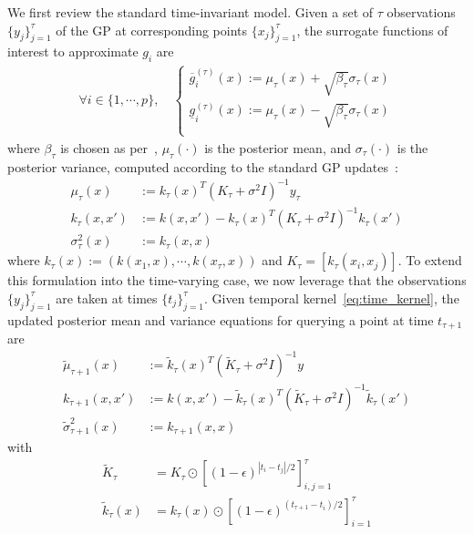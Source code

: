 \documentclass[preprint,12pt]{elsarticle}
\newcommand{\ul}{\underline}
\newcommand{\ol}{\overline}
\begin{document}
We first review the standard time-invariant model. Given a set of $\tau$ observations $\{y_j\}_{j=1}^\tau$ of the \ac{GP} at corresponding points $\{x_j\}_{j=1}^\tau$, the surrogate functions of interest to approximate $g_i$ are 
\begin{align}
    \forall i\in\{1,\cdots,p\}, \quad
    \begin{cases}
    \ol{g}_{i}^{(\tau)}(x) := \mu_\tau(x) + \sqrt{\beta_\tau}\sigma_{\tau}(x)\\
    \ul{g}_i^{(\tau)}(x) := \mu_\tau(x) - \sqrt{\beta_\tau}\sigma_{\tau}(x)\\
    \end{cases}\label{eq:GP-UCB}
\end{align}
where $\beta_\tau$ is chosen as per~\cite[Theorem 7]{caoMMGPOJCSYS},
$\mu_\tau(\cdot)$ is the posterior mean, and $\sigma_\tau(\cdot)$ is the posterior variance, computed according to the standard \ac{GP} updates~\cite{Rasmussen2006}:
\begin{align}
    \mu_\tau(x) &:= k_\tau(x)^T(K_\tau+\sigma^2 I)^{-1}y_\tau\\
    k_\tau(x,x') &:= k(x,x')-k_\tau(x)^T(K_\tau+\sigma^2 I)^{-1}k_\tau(x')\\
    \sigma_\tau^2(x) &:= k_\tau(x,x)
\end{align}
where $k_\tau(x):= (k(x_1,x),\cdots,k(x_\tau,x))$ and $K_\tau=\left[k_\tau(x_i,x_j)\right]$. To extend this formulation into the time-varying case, we now leverage that the observations $\{y_j\}_{j=1}^\tau$ are taken at times $\{t_j\}_{j=1}^\tau$. Given temporal kernel~\eqref{eq:time_kernel}, the updated posterior mean and variance equations for querying a point at time $t_{\tau + 1}$ are
\begin{align}
    \widetilde{\mu}_{\tau+1}(x) &:= \widetilde{k}_\tau(x)^T(\widetilde{K}_\tau+\sigma^2 I)^{-1}y \label{eq:tvmean}\\
    k_{\tau+1}(x,x') &:= k(x,x')-\widetilde{k}_\tau(x)^T(\widetilde{K}_\tau+\sigma^2 I)^{-1}\widetilde{k}_\tau(x')\\
    \widetilde{\sigma}_{\tau+1}^2(x) &:= k_{\tau+1}(x,x) \label{eq:tvsig}
\end{align}
with
\begin{align}
    \widetilde{K}_\tau &= K_\tau \odot [(1 - \epsilon)^{|t_i - t_j|/2}]_{i,j=1}^\tau \\
    \widetilde{k}_\tau(x) &= k_\tau(x) \odot [(1-\epsilon)^{(t_{\tau+1} - t_i)/2}]_{i=1}^\tau
\end{align}
\end{document}
